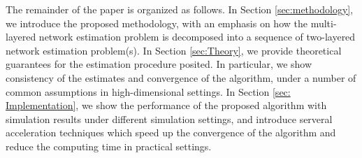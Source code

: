 The remainder of the paper is organized as follows. In Section \ref{sec:methodology}, we introduce the proposed methodology, with an emphasis on how the multi-layered network estimation problem is decomposed into a sequence of  two-layered network estimation problem(s).  In Section \ref{sec:Theory}, we provide theoretical guarantees for the estimation procedure posited. In particular, we show consistency of the estimates and convergence of the algorithm, under a number of common assumptions in high-dimensional settings. In Section \ref{sec: Implementation}, we show the performance of the proposed algorithm with simulation results under different simulation settings, and introduce serveral acceleration techniques which speed up the convergence of the algorithm and reduce the computing time in practical settings.

